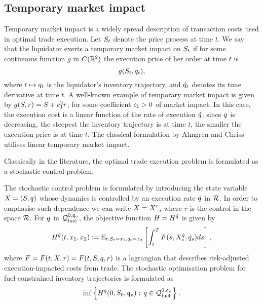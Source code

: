 \documentclass[10pt,a4paper]{article}
\begin{document}
\subsection{Temporary market impact}\label{sec.temporaryMarketImpact}
Temporary market impact is a widely spread description of transaction costs used in optimal trade execution. Let $S_t$ denote the price process at time $t$. We say that the liquidator exerts a temporary market impact on $S_t$ if for some continuous function $g$ in $C(\mathbb{R}^{2})$ the execution price of her order at time $t$ is 
\begin{equation*}
g(S_t,\dot{q}_t),
\end{equation*} 
where $t\mapsto q_t$ is the liquidator's inventory trajectory, and $\dot{q}_{t}$ denotes its time derivative at time $t$. A well-known example of temporary market impact is given by $g(S,r) = S+c_{1}^{2} r$, for some coefficient $c_{1}>0$ of market impact. In this case, the execution cost is a linear function of the rate of execution $\dot{q}$; since $q$ is decreasing, the steepest the inventory trajectory is at time $t$, the smaller the execution price is at time $t$. The classical formulation by Almgren and Chriss \cite{AC00opt} utilises linear temporary market impact. 

Classically in the literature, the optimal trade execution problem is formulated as a stochastic control problem. 

The stochastic control problem is formulated by introducing the state variable $X = (S,q)$ whose dynamics is controlled by an execution rate $\dot{q}$ in $\mathcal{R}$. In order to emphasise such dependence we can write $X=X^{r}$, where $r$ is the control in the space $\mathcal{R}$.  For $q$ in $\mathcal{Q}_{\text{fuel}}^{0,\mathfrak{q_0}}$, the objective function $H=H^{\dot{q}}$ is given by
\begin{equation}\label{eq.objectiveFunction}
H^{\dot{q}} (t,x_1,x_2) :=
\mathbb{{E}}_{t,S_t=x_1, q_t=x_2}
\left[
\int_{t}^{T} F(s,X^{\dot{q}}_s,\dot{q}_s) ds
\right],
\end{equation}
where $F=F(t,X,r)=F(t,S,q,r)$ is a lagrangian that describes risk-adjusted execution-impacted costs from trade. The stochastic optimisation problem for fuel-constrained inventory trajectories is formulated as 
\begin{equation}\label{eq.fuelConstrainedStochOptProblem}
\inf \left\lbrace 	H^{\dot{q}} (0,S_0,\mathfrak{q_0}): \, q \in \mathcal{Q}_{\text{fuel}}^{0,\mathfrak{q_0}} \right\rbrace . 
\end{equation}
\end{document}
